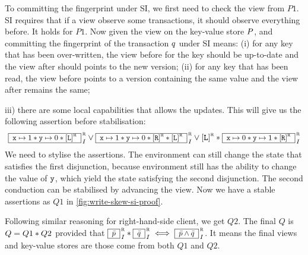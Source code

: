 To committing the fingerprint under SI, we first need to check the view from \( P1 \).
SI requires that if a view observe some transactions, it should observe everything before.
It holds for \( P1 \).
Now given the view on the key-value store \( P \), and committing the fingerprint of the transaction \( q \) under SI means: 
(i) for any key that has been over-written, the view before for the key should be up-to-date and the view after should points to the new version;
(ii) for any key that has been read, the view before points to a version containing the same value and the view after remains the same;
{iii) there are some local capabilities that allows the updates.
This will give us the following assertion before stabilisation:
\[
\boxass{ \vx \pt 1 \sep \vy \pt 0 \sep \cass{\CB{L}}{\lrid} }{\lrid}{\intass} 
\lor \boxass{\vx \pt 1 \sep \vy \pt 0  \sep \cass{\CB{R}}{\lrid} \sep \cass{\CB{L}}{\lrid} }{\lrid}{\intass}
\lor \cass{\CB{L}}{\lrid} \sep \boxass{\vx \pt 0 \sep \vy \pt 1 \sep \cass{\CB{R}}{\lrid} }{\lrid}{\intass} 
\]
We need to stylise the assertions.
The environment can still change the state that satisfies the first disjunction, because environment still has the ability  to change the value of \( \texttt{y} \), which yield the state satisfying the second disjunction.
The second conduction can be stabilised by advancing the view.
Now we have a stable assertions as \( Q1 \) in \cref{fig:write-skew-si-proof}.

Following similar reasoning for right-hand-side client, we get \( Q2 \).
The final \( Q \) is  \( Q = Q1 \mathbin{*} Q2 \) provided that \( \boxass{\bar{\lpre}}{\lrid}{\intass} \sep \boxass{\bar{\lpost}}{\lrid}{\intass} \iff \boxass{\bar{\lpre} \land \bar{\lpost}}{\lrid}{\intass}\).
It means the final views and key-value stores are those come from both \( Q1 \) and \( Q2 \).

}
